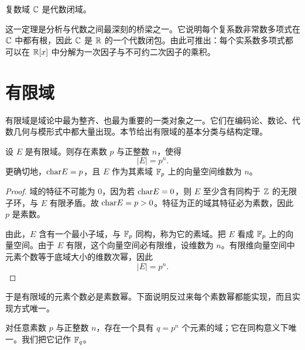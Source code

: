 \begin{theorem}[代数学基本定理]
复数域 $\mathbb{C}$ 是代数闭域。
\end{theorem}

\begin{remark}
这一定理是分析与代数之间最深刻的桥梁之一。它说明每个复系数非常数多项式在 $\mathbb{C}$ 中都有根，因此 $\mathbb{C}$ 是 $\mathbb{R}$ 的一个代数闭包。由此可推出：每个实系数多项式都可以在 $\mathbb{R}[x]$ 中分解为一次因子与不可约二次因子的乘积。
\end{remark}

\section{有限域}

有限域是域论中最为整齐、也最为重要的一类对象之一。它们在编码论、数论、代数几何与模形式中都大量出现。本节给出有限域的基本分类与结构定理。

\begin{proposition}
设 $E$ 是有限域。则存在素数 $p$ 与正整数 $n$，使得
\[
|E|=p^n.
\]
更确切地，$\mathrm{char} E=p$，且 $E$ 作为其素域 $\mathbb{F}_p$ 上的向量空间维数为 $n$。
\end{proposition}

\begin{proof}
域的特征不可能为 $0$，因为若 $\mathrm{char} E=0$，则 $E$ 至少含有同构于 $\mathbb{Z}$ 的无限子环，与 $E$ 有限矛盾。故 $\mathrm{char} E=p>0$。特征为正的域其特征必为素数，因此 $p$ 是素数。

由此，$E$ 含有一个最小子域，与 $\mathbb{F}_p$ 同构，称为它的素域。把 $E$ 看成 $\mathbb{F}_p$ 上的向量空间。由于 $E$ 有限，这个向量空间必有限维，设维数为 $n$。有限维向量空间中元素个数等于底域大小的维数次幂，因此
\[
|E|=p^n.
\]
\end{proof}

于是有限域的元素个数必是素数幂。下面说明反过来每个素数幂都能实现，而且实现方式唯一。

\begin{theorem}[有限域的存在与唯一性]
对任意素数 $p$ 与正整数 $n$，存在一个具有 $q=p^n$ 个元素的域；它在同构意义下唯一。我们把它记作 $\mathbb{F}_q$。
\end{theorem}

